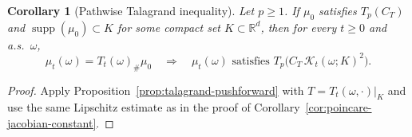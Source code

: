 \documentclass{tsp-short}
\newtheorem{corollary}{Corollary}[section]
\theoremstyle{remark}
\newtheorem{remark}{Remark}[section]
\theoremstyle{definition}
\begin{document}
\begin{corollary}[Pathwise Talagrand inequality]\label{cor:talagrand-jacobian-constant}
Let $p\ge1$.
If $\mu_0$ satisfies $T_p(C_T)$ and $\operatorname{supp}(\mu_0)\subset K$ for some compact set $K\subset\mathbb{R}^d$, then for every $t\ge0$ and a.s.\ $\omega$,
\begin{equation*}
\mu_t(\omega)=T_t(\omega)_{\#}\mu_0
\quad\Longrightarrow\quad
\mu_t(\omega)\text{ satisfies }T_p\big(C_T\,\mathcal K_t(\omega;K)^2\big).
\end{equation*}
\end{corollary}

\begin{proof}
Apply Proposition~\ref{prop:talagrand-pushforward} with $T=T_t(\omega,\cdot)|_K$ and use the same Lipschitz estimate as in the proof of Corollary~\ref{cor:poincare-jacobian-constant}.
\end{proof}




\end{document}
